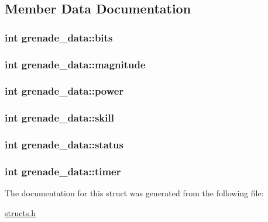 \subsection{Member Data Documentation}
\hypertarget{structgrenade__data_a46484cc301a9a80eddbc7dde6566fb3e}{
\subsubsection[{bits}]{\setlength{\rightskip}{0pt plus 5cm}int grenade\-\_\-data\-::bits}}\label{structgrenade__data_a46484cc301a9a80eddbc7dde6566fb3e}
\hypertarget{structgrenade__data_a59c291091ff3df3d9e8aa03fa79c526e}{
\subsubsection[{magnitude}]{\setlength{\rightskip}{0pt plus 5cm}int grenade\-\_\-data\-::magnitude}}\label{structgrenade__data_a59c291091ff3df3d9e8aa03fa79c526e}
\hypertarget{structgrenade__data_acfbd2c54ce5924b79f629f87c2b7f520}{
\subsubsection[{power}]{\setlength{\rightskip}{0pt plus 5cm}int grenade\-\_\-data\-::power}}\label{structgrenade__data_acfbd2c54ce5924b79f629f87c2b7f520}
\hypertarget{structgrenade__data_a9bff04e0e06b0154450e9ff48d0bf3a6}{
\subsubsection[{skill}]{\setlength{\rightskip}{0pt plus 5cm}int grenade\-\_\-data\-::skill}}\label{structgrenade__data_a9bff04e0e06b0154450e9ff48d0bf3a6}
\hypertarget{structgrenade__data_ad08b07a9b38e50e92559ae368a8f845c}{
\subsubsection[{status}]{\setlength{\rightskip}{0pt plus 5cm}int grenade\-\_\-data\-::status}}\label{structgrenade__data_ad08b07a9b38e50e92559ae368a8f845c}
\hypertarget{structgrenade__data_a57800189fccf7530e4497102c8fdd203}{
\subsubsection[{timer}]{\setlength{\rightskip}{0pt plus 5cm}int grenade\-\_\-data\-::timer}}\label{structgrenade__data_a57800189fccf7530e4497102c8fdd203}


The documentation for this struct was generated from the following file\-:\begin{DoxyCompactItemize}
\item 
\hyperlink{structs_8h}{structs.\-h}\end{DoxyCompactItemize}
